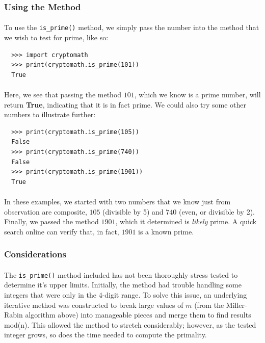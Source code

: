 \documentclass[12pt,a4paper]{article}
\begin{document}
\subsubsection{Using the Method}
\paragraph{}
To use the \verb|is_prime()| method, we simply pass the number into the method 
that we wish to test for prime, like so:

\begin{verbatim}
  >>> import cryptomath
  >>> print(cryptomath.is_prime(101))
  True
\end{verbatim}

\paragraph{}
Here, we see that passing the method $101$, which we know is a prime number, 
will return \textbf{True}, indicating that it is in fact prime.  We could also 
try some other numbers to illustrate further:

\begin{verbatim}
  >>> print(cryptomath.is_prime(105)) 
  False
  >>> print(cryptomath.is_prime(740)) 
  False
  >>> print(cryptomath.is_prime(1901)) 
  True
\end{verbatim}

\paragraph{}
In these examples, we started with two numbers that we know just from observation 
are composite, $105$ (divisible by 5) and $740$ (even, or divisible by 2).  
Finally, we passed the method $1901$, which it determined is \textit{likely} 
prime.  A quick search online can verify that, in fact, $1901$ is a known 
prime.

\subsubsection{Considerations}
\paragraph{}
The \verb|is_prime()| method included has not been thoroughly stress tested to 
determine it's upper limits.  Initially, the method had trouble handling some 
integers that were only in the 4-digit range.  To solve this issue, an 
underlying iterative method was constructed to break large values of $m$ (from 
the Miller-Rabin algorithm above) into manageable pieces and merge them to find 
results mod(n).  This allowed the method to stretch considerably;
however, as the tested integer grows, so does the time needed to compute the 
primality.
\end{document}
